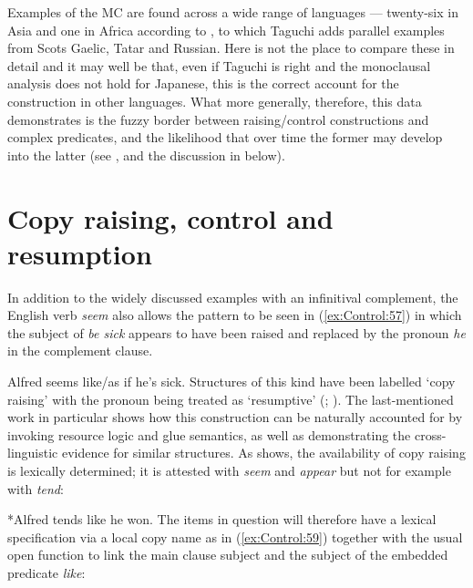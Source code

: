\documentclass[output=paper,hidelinks]{langscibook}
\begin{document}
\ea\label{ex:Control:56}
\ea\label{ex:Control:56a}  
\ex\label{ex:Control:56b}  
\z\z

Examples of the MC are found across a wide range of languages --- twenty-six in Asia and one in Africa according to \citet[1]{Tsunoda2020}, to which Taguchi adds parallel examples from Scots Gaelic, Tatar and Russian. Here is not the place to compare these in detail and it may well be that, even if Taguchi is right and the monoclausal analysis does not hold for Japanese, this is the correct account for the construction in other languages. What more generally, therefore, this data demonstrates is the fuzzy border between raising/control constructions and complex predicates, and the likelihood that over time the former may develop into the latter (see \citealt{Butt2014},  and the discussion in  below).

\section{Copy raising, control and resumption}
\label{sec:Control:9}

In addition to the widely discussed examples with an infinitival complement, the English verb \emph{seem} also allows the pattern to be seen in (\ref{ex:Control:57}) in which the subject of \emph{be sick} appears to have been raised and replaced by the pronoun \emph{he} in the complement clause.

\ea\label{ex:Control:57} Alfred seems like/as if he's sick.
\z
Structures of this kind have been labelled `copy raising' with the pronoun being treated as `resumptive' (\citealt{AsudehToivonen2007,AshT:12}; \citealt{Asudeh12}). The last-mentioned work in particular shows how this construction can be naturally accounted for by invoking resource logic and glue semantics, as well as demonstrating the cross-linguistic evidence for similar structures. As \citet[chapter~12]{Asudeh12} shows, the availability of copy raising is lexically determined; it is attested with \emph{seem} and \emph{appear} but not for example with \emph{tend}:

\ea\label{ex:Control:58} *Alfred tends like he won.
\z
The items in question will therefore have a lexical specification via a local copy name as in (\ref{ex:Control:59}) together with the usual open function to link the main clause subject and the subject of the embedded predicate \emph{like}:
\end{document}
